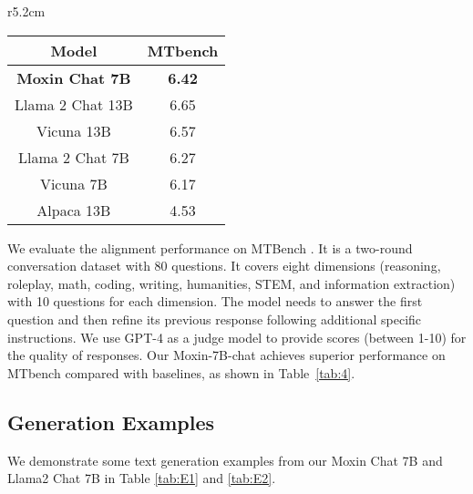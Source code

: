 \begin{wraptable}{r}{5.2cm}
\vspace{-5pt}\caption{Performance  for various chat models.}\label{tab:4}
\begin{tabular}{c|c}
\hline
Model                   & MTbench       \\ \hline
\textbf{Moxin Chat 7B} & \textbf{6.42} \\
Llama 2 Chat 13B         & 6.65          \\
Vicuna 13B              & 6.57          \\
Llama 2 Chat 7B          & 6.27          \\
Vicuna 7B               & 6.17          \\
Alpaca 13B              & 4.53          \\
\hline
\end{tabular}
\end{wraptable}
We evaluate the alignment performance on MTBench \cite{zheng2023judging}. 
It is a two-round conversation dataset with 80 questions. It covers eight dimensions (reasoning, roleplay, math, coding, writing, humanities, STEM, and information extraction) with 10 questions for each dimension. The model needs to answer the first question and then refine its previous response following additional specific instructions.  We use GPT-4 as a judge model to provide scores  (between 1-10) for the quality of responses. Our Moxin-7B-chat achieves superior performance on MTbench compared with baselines, as shown in Table~\ref{tab:4}. 


\subsection{Generation Examples}  
We demonstrate some text generation examples from our Moxin Chat 7B and Llama2 Chat 7B in Table \ref{tab:E1} and \ref{tab:E2}.


